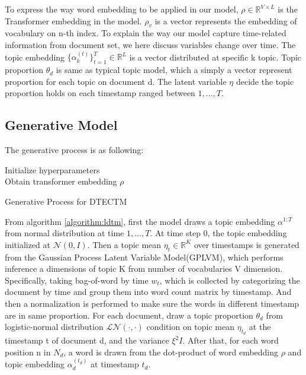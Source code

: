 To express the way word embedding to be applied in our model, $ \rho\in\mathbb{R}^{V\times L} $ is the Transformer embedding in the model. $ \rho_v $ is a vector represents the embedding of vocabulary on n-th index.
To explain the way our model capture time-related information from document set, we here discuss variables change over time. The topic embedding $ \{\alpha^{(t)}_k\}^{T}_{t=1}\in\mathbb{R}^{L} $ is a vector distributed at specific k topic.
Topic proportion $ \theta_d $ is same as typical topic model, which a simply a vector represent proportion for each topic on document d.
The latent variable $ \eta $ decide the topic proportion holds on each timestamp ranged between $ 1, \dots, T $. 
\subsection{Generative Model}
The generative process is as following:\\
\begin{algorithm}[H]
Initialize hyperparameters\\
Obtain transformer embedding $ \rho $\\
\caption{Generative Process for DTECTM}
\label{algorithm:ldtm}
\end{algorithm}
From algorithm \ref{algorithm:ldtm}, first the model draws a topic embedding $ \alpha^{1:T} $ from normal distribution at time $ 1,\dots,T $. At time step 0, the topic embedding initialized at $ \mathcal{N}(0,I) $.
Then a topic mean $ \eta_t\in\mathbb{R}^{K} $ over timestamps is generated from the Gaussian Process Latent Variable Model(GPLVM), which performs inference a dimensions of topic K from number of vocabularies V dimension. Specifically, taking bag-of-word by time $ w_t $, which is collected by categorizing the document by time and group them into word count matrix by timestamp. And then a normalization is performed to make sure the words in different timestamp are in same proportion.
For each document, draw a topic proportion $ \theta_{d} $ from logistic-normal distribution $ \mathcal{LN}(\cdot,\cdot) $ condition on topic mean $ \eta_{t_d} $ at the timestamp t of document d, and the variance $ \xi^2I $.
After that, for each word position n in $ N_d $, a word is drawn from the dot-product of word embedding $ \rho $ and topic embedding $ \alpha^{(t_d)}_{d} $ at timestamp $ t_d $. 
